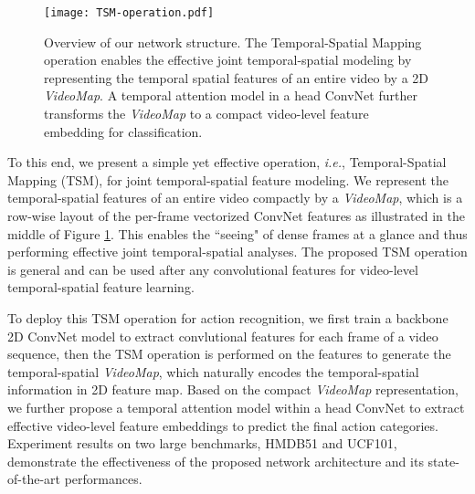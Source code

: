 \documentclass[english, 10pt, twocolumn, twoside]{IEEEtran}
\begin{document}
\begin{figure}[t]
  \begin{center}
   \texttt{[image: TSM-operation.pdf]}
  \end{center}
  \vspace{-5mm}
  \caption{Overview of our network structure. The Temporal-Spatial Mapping operation enables the effective joint temporal-spatial modeling by representing the temporal spatial features of an entire video by a 2D \emph{VideoMap}. A temporal attention model in a head ConvNet further transforms the  \emph{VideoMap} to a compact video-level feature embedding for classification.}
  \label{fig:TSM-operation}
  \vspace{-3mm}
\end{figure}

To this end, we present a simple yet effective operation, \emph{i.e.}, Temporal-Spatial Mapping (TSM), for joint temporal-spatial feature modeling. We represent the temporal-spatial features of an entire video compactly by a \emph{VideoMap}, which is a row-wise layout of the per-frame vectorized ConvNet features as illustrated in the middle of Figure \ref{fig:TSM-operation}. This enables the ``seeing" of dense frames at a glance and thus performing effective joint temporal-spatial analyses. The proposed TSM operation is general and can be used after any convolutional features for video-level temporal-spatial feature learning.

To deploy this TSM operation for action recognition, we first train a backbone 2D ConvNet model to extract convlutional features for each frame of a video sequence, then the TSM operation is performed on the features to generate the temporal-spatial \emph{VideoMap}, which naturally encodes the temporal-spatial information in 2D feature map. Based on the compact \emph{VideoMap} representation, we further propose a temporal attention model within a head ConvNet to extract effective video-level feature embeddings to predict the final action categories. Experiment results on two large benchmarks, HMDB51 and UCF101, demonstrate the effectiveness of the proposed network architecture and its state-of-the-art performances.
\end{document}
